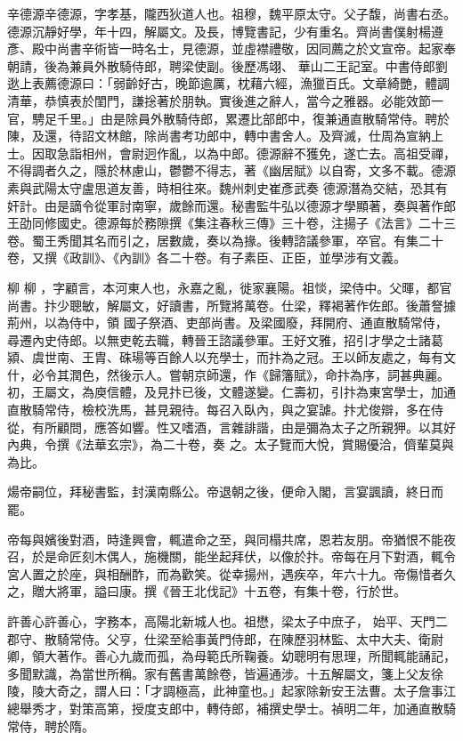 \begin{pinyinscope}
 辛德源辛德源，字孝基，隴西狄道人也。祖穆，魏平原太守。父子馥，尚書右丞。德源沉靜好學，年十四，解屬文。及長，博覽書記，少有重名。齊尚書僕射楊遵彥、殿中尚書辛術皆一時名士，見德源，並虛襟禮敬，因同薦之於文宣帝。起家奉朝請，後為兼員外散騎侍郎，聘梁使副。後歷馮翊、
 華山二王記室。中書侍郎劉逖上表薦德源曰：「弱齡好古，晚節逾厲，枕藉六經，漁獵百氏。文章綺艷，體調清華，恭慎表於閨門，謙捴著於朋執。實後進之辭人，當今之雅器。必能效節一官，騁足千里。」由是除員外散騎侍郎，累遷比部郎中，復兼通直散騎常侍。聘於陳，及還，待詔文林館，除尚書考功郎中，轉中書舍人。及齊滅，仕周為宣納上士。因取急詣相州，會尉迥作亂，以為中郎。德源辭不獲免，遂亡去。高祖受禪，不得調者久之，隱於林慮山，鬱鬱不得志，著《幽居賦》以自寄，文多不載。德源素與武陽太守盧思道友善，時相往來。魏州刺史崔彥武奏
 德源潛為交結，恐其有奸計。由是謫令從軍討南寧，歲餘而還。秘書監牛弘以德源才學顯著，奏與著作郎王劭同修國史。德源每於務隙撰《集注春秋三傳》三十卷，注揚子《法言》二十三卷。蜀王秀聞其名而引之，居數歲，奏以為掾。後轉諮議參軍，卒官。有集二十卷，又撰《政訓》、《內訓》各二十卷。有子素臣、正臣，並學涉有文義。


柳
 柳
 ，字顧言，本河東人也，永嘉之亂，徙家襄陽。祖惔，梁侍中。父暉，都官尚書。抃少聰敏，解屬文，好讀書，所覽將萬卷。仕梁，釋褐著作佐郎。後蕭詧據荊州，以為侍中，領
 國子祭酒、吏部尚書。及梁國廢，拜開府、通直散騎常侍，尋遷內史侍郎。以無吏乾去職，轉晉王諮議參軍。王好文雅，招引才學之士諸葛潁、虞世南、王胄、硃瑒等百餘人以充學士，而抃為之冠。王以師友處之，每有文什，必令其潤色，然後示人。嘗朝京師還，作《歸籓賦》，命抃為序，詞甚典麗。初，王屬文，為庾信體，及見抃已後，文體遂變。仁壽初，引抃為東宮學士，加通直散騎常侍，檢校洗馬，甚見親待。每召入臥內，與之宴謔。抃尤俊辯，多在侍從，有所顧問，應答如響。性又嗜酒，言雜誹諧，由是彌為太子之所親狎。以其好內典，令撰《法華玄宗》，為二十卷，奏
 之。太子覽而大悅，賞賜優洽，儕輩莫與為比。



 煬帝嗣位，拜秘書監，封漢南縣公。帝退朝之後，便命入閣，言宴諷讀，終日而罷。



 帝每與嬪後對酒，時逢興會，輒遣命之至，與同榻共席，恩若友朋。帝猶恨不能夜召，於是命匠刻木偶人，施機關，能坐起拜伏，以像於抃。帝每在月下對酒，輒令宮人置之於座，與相酬酢，而為歡笑。從幸揚州，遇疾卒，年六十九。帝傷惜者久之，贈大將軍，謚曰康。撰《晉王北伐記》十五卷，有集十卷，行於世。



 許善心許善心，字務本，高陽北新城人也。祖懋，梁太子中庶子，
 始平、天門二郡守、散騎常侍。父亨，仕梁至給事黃門侍郎，在陳歷羽林監、太中大夫、衛尉卿，領大著作。善心九歲而孤，為母範氏所鞠養。幼聰明有思理，所聞輒能誦記，多聞默識，為當世所稱。家有舊書萬餘卷，皆遍通涉。十五解屬文，箋上父友徐陵，陵大奇之，謂人曰：「才調極高，此神童也。」起家除新安王法曹。太子詹事江總舉秀才，對策高第，授度支郎中，轉侍郎，補撰史學士。禎明二年，加通直散騎常侍，聘於隋。




\end{pinyinscope}
